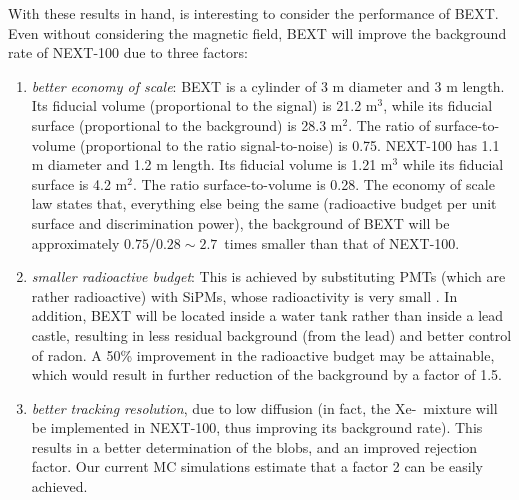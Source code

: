 \documentclass{JINST}
\begin{document}
With these results in hand, is interesting to consider the performance of BEXT. Even without considering the magnetic field, BEXT will improve the background rate of NEXT-100 due to three factors:
\begin{enumerate}
\item {\em better economy of scale}: BEXT is a cylinder of 3 m diameter and 3 m length. Its fiducial volume (proportional to the signal) is 21.2 m$^3$, while its fiducial surface (proportional to the background) is 28.3 m$^2$. The ratio of surface-to-volume (proportional to the ratio signal-to-noise) is 0.75.  NEXT-100 has 1.1 m diameter and 1.2 m length. Its fiducial volume is 1.21 m$^3$ while its fiducial surface is 4.2 m$^2$. The ratio surface-to-volume is 0.28. The economy of scale law states that, everything else being the same (radioactive budget per unit surface and discrimination power), the background of BEXT will be approximately 
$0.75/0.28 \sim 2.7$~times smaller than that of NEXT-100. 
\item {\em smaller radioactive budget}: This is achieved by substituting PMTs (which are rather radioactive) with SiPMs, whose radioactivity is very small \cite{NEXT_radiopurity}. In addition, BEXT will be located inside a water tank rather than inside a lead castle, resulting in less residual background (from the lead) and better control of radon. A 50\% improvement in the radioactive budget may be attainable, which would result in further reduction of the background by a factor of 1.5.
\item {\em better tracking resolution}, due to low diffusion (in fact, the Xe-\COT\ mixture will be implemented in NEXT-100, thus improving its background rate). This results in a better determination of the blobs, and an improved rejection factor. Our current MC simulations estimate that a factor 2 can be easily achieved.
\end{enumerate}
\end{document}
